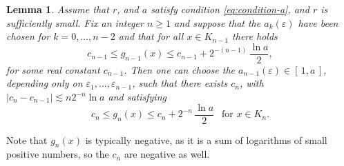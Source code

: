\documentclass[JEP,XML,SOM,Unicode,published]{cedram}
\numberwithin{equation}{section}
\theoremstyle{plain}
\newtheorem{lem}{Lemma}[section]
\theoremstyle{definition}
\begin{document}
\begin{lem}\label{mainLemma}
Assume that $r$, and $a$ satisfy condition \eqref{eq:condition-a}, and $r$ is sufficiently small.
Fix an integer $n\ge 1$ and suppose that the $a_k(\varepsilon)$ have been chosen for $k= 0,\dots, n-2$
and that for all $x \in K_{n-1}$ there holds
\begin{equation}\label{eq:iter-step-n-1}
c_{n-1} \le g_{n-1}(x) \le c_{n-1} + 2^{-(n-1)}\, \dfrac{\ln a}{2},
\end{equation}
for some real constant $c_{n-1}$. Then one can choose the $a_{n-1}(\varepsilon)\in [\,1,a\,]$,
depending only on $\varepsilon_1, \dotsc, \varepsilon_{n-1}$, such that there exists $c_n$,
with $|c_n-c_{n-1}| \lesssim n 2^{-n}\ln a$ and satisfying
\begin{equation}\label{eq:iter-step-n}
c_n \le g_n (x) \le c_n + 2^{-n}\, \dfrac{\ln a}{2}
\ \ \text{ for $x\in K_n$.}
\end{equation}
\end{lem}
Note that $g_n(x)$ is typically negative, as it is a sum of logarithms of small positive numbers, so the $c_n$ are negative as well.
\end{document}

